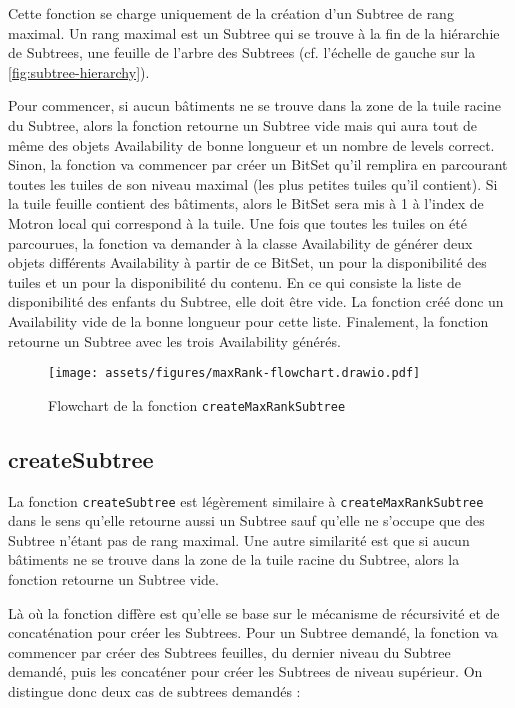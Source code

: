 Cette fonction se charge uniquement de la création d'un Subtree de rang maximal. Un rang maximal est un Subtree qui se trouve à la fin de la hiérarchie de Subtrees, une feuille de l'arbre des Subtrees (cf. l'échelle de gauche sur la \autoref{fig:subtree-hierarchy}).

Pour commencer, si aucun bâtiments ne se trouve dans la zone de la tuile racine du Subtree, alors la fonction retourne un Subtree vide mais qui aura tout de même des objets Availability de bonne longueur et un nombre de levels correct. Sinon, la fonction va commencer par créer un BitSet qu’il remplira en parcourant toutes les tuiles de son niveau maximal (les plus petites tuiles qu'il contient). Si la tuile feuille contient des bâtiments, alors le BitSet sera mis à 1 à l'index de Motron local qui correspond à la tuile. Une fois que toutes les tuiles on été parcourues, la fonction va demander à la classe Availability de générer deux objets différents Availability à partir de ce BitSet, un pour la disponibilité des tuiles et un pour la disponibilité du contenu. En ce qui consiste la liste de disponibilité des enfants du Subtree, elle doit être vide. La fonction créé donc un Availability vide de la bonne longueur pour cette liste. Finalement, la fonction retourne un Subtree avec les trois Availability générés.

\begin{figure}[H]
    \centering
    \texttt{[image: assets/figures/maxRank-flowchart.drawio.pdf]}
    \caption{Flowchart de la fonction \texttt{createMaxRankSubtree}}
    \label{fig:maxrank-flowchart}
\end{figure}

\newpage
\subsection*{createSubtree}

La fonction \texttt{createSubtree} est légèrement similaire à \texttt{createMaxRankSubtree} dans le sens qu'elle retourne aussi un Subtree sauf qu'elle ne s'occupe que des Subtree n'étant pas de rang maximal. Une autre similarité est que si aucun bâtiments ne se trouve dans la zone de la tuile racine du Subtree, alors la fonction retourne un Subtree vide.

Là où la fonction diffère est qu'elle se base sur le mécanisme de récursivité et de concaténation pour créer les Subtrees. Pour un Subtree demandé, la fonction va commencer par créer des Subtrees feuilles, du dernier niveau du Subtree demandé, puis les concaténer pour créer les Subtrees de niveau supérieur. On distingue donc deux cas de subtrees demandés :

